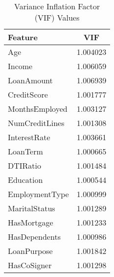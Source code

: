\begin{table}[H]\centering
\caption{Variance Inflation Factor (VIF) Values}
\label{Table 4:vif_values}
\begin{tabular}{lc}
\toprule
Feature & VIF \\
\midrule
Age & 1.004023 \\
Income & 1.006059 \\
LoanAmount & 1.006939 \\
CreditScore & 1.001777 \\
MonthsEmployed & 1.003127 \\
NumCreditLines & 1.001308 \\
InterestRate & 1.003661 \\
LoanTerm & 1.000665 \\
DTIRatio & 1.001484 \\
Education & 1.000544 \\
EmploymentType & 1.000999 \\
MaritalStatus & 1.001289 \\
HasMortgage & 1.001233 \\
HasDependents & 1.000986 \\
LoanPurpose & 1.001842 \\
HasCoSigner & 1.001298 \\
\bottomrule
\end{tabular}
\end{table}

